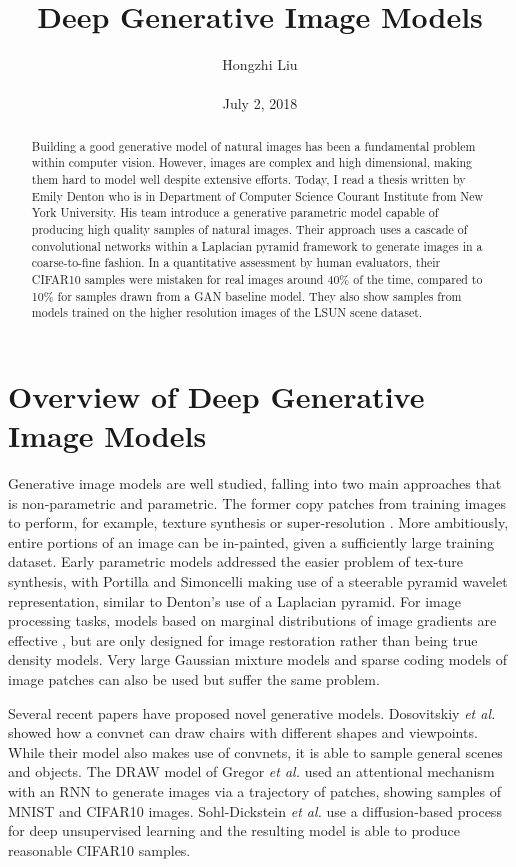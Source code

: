 \documentclass[10pt,twocolumn,letterpaper]{article}
\title{Deep Generative Image Models}
\author{Hongzhi Liu\\\\
July 2, 2018}
\begin{document}
\maketitle
\begin{abstract}
	Building a good generative model of natural images has been a fundamental problem within computer vision. However, images are complex and high dimensional, making them hard to model well despite extensive efforts. Today, I read a thesis written by Emily Denton who is in Department of Computer Science Courant Institute from New York University. His team introduce a generative parametric model capable of producing high quality samples of natural images. Their approach uses a cascade of convolutional networks within a Laplacian pyramid framework to generate images in a coarse-to-fine fashion. In a quantitative assessment by human evaluators, their CIFAR10 samples were mistaken for real images around 40\% of the time, compared to 10\% for samples drawn from a GAN baseline model. They also show samples from models trained on the higher resolution images of the LSUN scene dataset.
\end{abstract}
\section{Overview of Deep Generative Image Models}

Generative image models are well studied, falling into two main approaches that is non-parametric and parametric. The former copy patches from training images to perform, for example, texture synthesis \cite{Efros1999Texture} or super-resolution \cite{Freeman2013Example}. More ambitiously, entire portions of an image can be in-painted, given a sufficiently large training dataset. Early parametric models addressed the easier problem of tex-ture synthesis, with Portilla and Simoncelli \cite{Portilla2000A} making use of a steerable pyramid wavelet representation, similar to Denton's use of a Laplacian pyramid. For image processing tasks, models based on marginal distributions of image gradients are effective \cite{Roth2005Fields}, but are only designed for image restoration rather than being true density models. Very large Gaussian mixture models \cite{Zoran2011From} and sparse coding models of image patches can also be used but suffer the same problem.

Several recent papers have proposed novel generative models. Dosovitskiy \emph{et al.} \cite{Dosovitskiy2015Learning} showed how a convnet can draw chairs with different shapes and viewpoints. While their model also makes use of convnets, it is able to sample general scenes and objects. The DRAW model of Gregor \emph{et al.} \cite{Gregor2015DRAW} used an attentional mechanism with an RNN to generate images via a trajectory of patches, showing samples of MNIST and CIFAR10 images. Sohl-Dickstein \emph{et al.} \cite{Sohl2015Deep} use a diffusion-based process for deep unsupervised learning and the resulting model is able to produce reasonable CIFAR10 samples.
\end{document}
